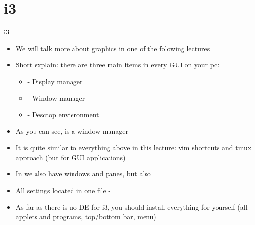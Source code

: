 \documentclass[usenames,dvipsnames,10pt,aspectratio=169]{beamer}
\begin{document}

\section{i3}
\begin{frame}{i3}
    \begin{itemize}
        \item We will talk more about graphics in one of the folowing lectures
        \item Short explain: there are three main items in every GUI on your pc:
        \begin{itemize}
            \item {} - Display manager
            \item {} - Window manager
            \item {} - Desctop envieronment
        \end{itemize}
        \item As you can see,  is a window manager
        \item It is quite similar to everything above in this lecture: vim shortcuts and tmux approach (but for GUI applications)
        \item In  we also have windows and panes, but also 
        \item All settings located in one file - 
        \item As far as there is no DE for i3, you should install everything for yourself (all applets and programs, top/bottom bar, menu)
    \end{itemize}
\end{frame}
\end{document}
